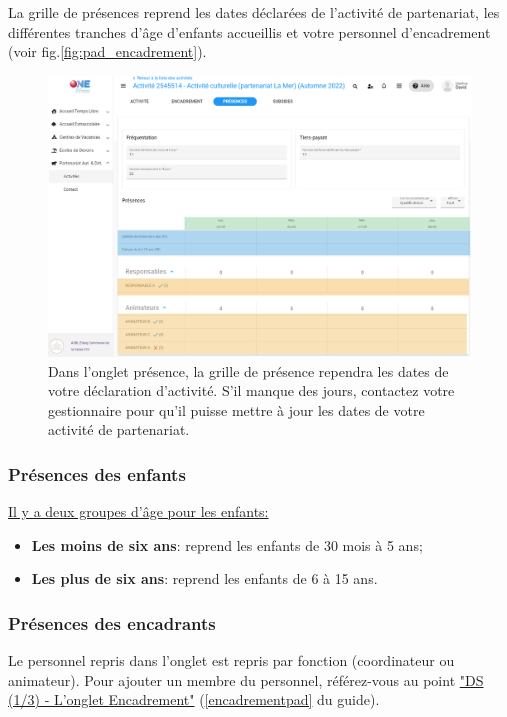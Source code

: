 La grille de présences reprend les \textcolor{vert}{dates déclarées} de l'activité de partenariat, les différentes \textcolor{bleu}{tranches d'âge d'enfants} accueillis et votre \textcolor{ocre}{personnel d'encadrement} (voir fig.\ref{fig:pad_encadrement}).

\begin{figure}[h!]
    \centering
    \includegraphics[width=15cm]{Images/pad/onglet-encadrement2.png}
    \caption{Dans l'onglet présence, la grille de présence rependra les dates de votre déclaration d'activité. S'il manque des jours, contactez votre gestionnaire pour qu'il puisse mettre à jour les dates de votre activité de partenariat.}
    \label{fig:pad_presences}
\end{figure}


\subsubsection{Présences des enfants}
\underline{Il y a deux groupes d'âge pour les enfants:}

\begin{itemize}
    \item \textbf{Les moins de six ans}: reprend les enfants de 30 mois à 5 ans;
    \item \textbf{Les plus de six ans}: reprend les enfants de 6 à 15 ans.
\end{itemize}

\subsubsection{Présences des encadrants}
Le personnel repris dans l'onglet  est repris par fonction (coordinateur ou animateur). Pour ajouter un membre du personnel, référez-vous au point \hyperref[encadrementpad]{"DS (1/3) ‐ L’onglet Encadrement"} (\ref{encadrementpad} du guide).

